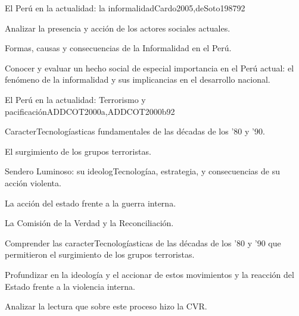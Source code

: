\begin{syllabus}
\begin{unit}{El Perú en la actualidad: la informalidad}{Cardo2005,deSoto1987}{9}{2}
\begin{topics}
      \item Analizar la presencia y acción de los actores sociales actuales.
      \item Formas, causas y consecuencias de la Informalidad en el Perú.
\end{topics}

\begin{unitgoals}
      \item Conocer y evaluar un hecho social de especial importancia en el Perú actual: el fenómeno de la informalidad y sus implicancias en el desarrollo nacional.
\end{unitgoals}
\end{unit}

\begin{unit}{El Perú en la actualidad: Terrorismo y pacificación}{ADDCOT2000a,ADDCOT2000b}{9}{2}
\begin{topics}
      \item CaracterTecnologíasticas fundamentales de las décadas de los '80 y '90.
      \item El surgimiento de los grupos terroristas.
      \item Sendero Luminoso: su ideologTecnologíaa, estrategia, y consecuencias de su acción violenta.
      \item La acción del estado frente a la guerra interna.
      \item La Comisión de la Verdad y la Reconciliación.
\end{topics}
\begin{unitgoals}
      \item Comprender las caracterTecnologíasticas de las décadas de los '80 y '90 que permitieron el surgimiento de los grupos terroristas.
      \item Profundizar en la ideología y el accionar de estos movimientos y la reacción del Estado frente a la violencia interna.
      \item Analizar la lectura que sobre este proceso hizo la CVR.
\end{unitgoals}
\end{unit}

\begin{coursebibliography}
\end{coursebibliography}

\end{syllabus}

%
